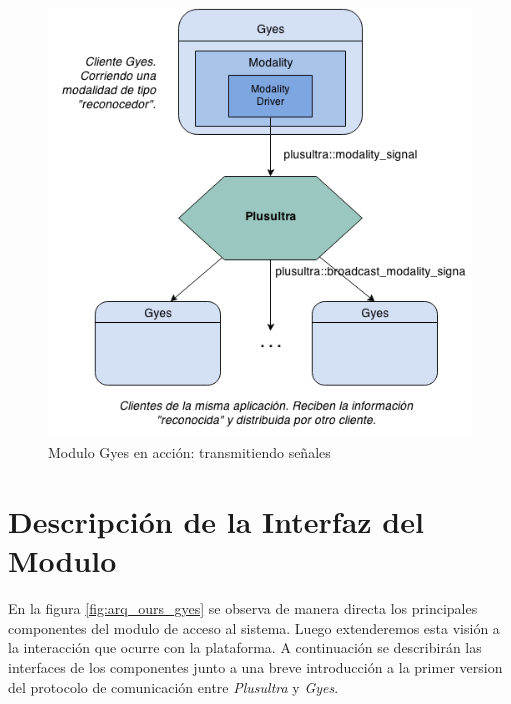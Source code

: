 \begin{center}
  \begin{figure}[h]
    \includegraphics[scale=0.7]{gfx/gyes_action}
    \caption{Modulo Gyes en acción: transmitiendo señales}
    \label{fig:arq_ours_gyes_action}
  \end{figure}
\end{center}

\section{Descripción de la Interfaz del Modulo} \label{sec:enlace_api}
En la figura \ref{fig:arq_ours_gyes} se observa de manera directa los principales componentes del modulo de acceso al sistema. Luego extenderemos esta visión a la interacción que ocurre con la plataforma.
A continuación se describirán las interfaces de los componentes junto a una breve introducción a la primer version del protocolo de comunicación entre \emph{Plusultra} y \emph{Gyes}.

